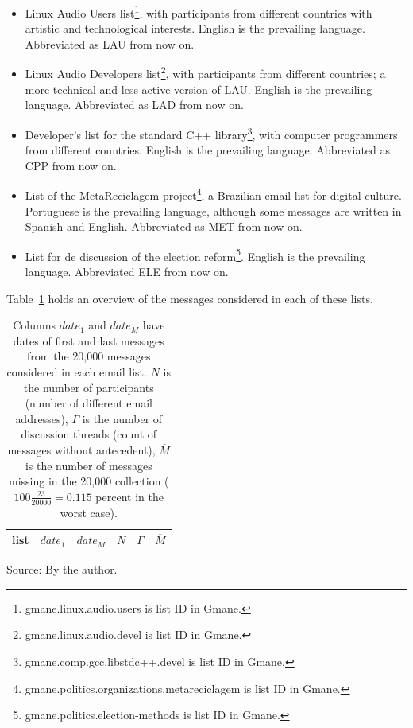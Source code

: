 \documentclass[review]{elsarticle}
\begin{document}
\begin{itemize}
\item Linux Audio Users list\footnote{gmane.linux.audio.users is list ID in Gmane.}, with participants from different countries with artistic and technological interests. English is the prevailing language. Abbreviated as LAU from now on.
\item Linux Audio Developers list\footnote{gmane.linux.audio.devel is list ID in Gmane.}, with participants from different countries; a more technical and less active version of LAU. English is the prevailing language. Abbreviated as LAD from now on.
\item Developer's list for the standard C++ library\footnote{gmane.comp.gcc.libstdc++.devel is list ID in Gmane.}, with computer programmers from different countries. English is the prevailing language. Abbreviated as CPP from now on.
\item List of the MetaReciclagem project\footnote{gmane.politics.organizations.metareciclagem is list ID in Gmane.}, a Brazilian email list for digital culture. Portuguese is the prevailing language, although some messages are written in Spanish and English. Abbreviated as MET from now on.
\item List for de discussion of the election reform\footnote{gmane.politics.election-methods is list ID in Gmane.}. English is the prevailing language. Abbreviated ELE from now on.
\end{itemize} 

Table~\ref{tab:genLists} holds an overview of the messages considered in each of these lists.

\begin{table}
\centering
\caption{Columns $date_1$ and $date_M$ have dates of first and last messages from the 20,000 messages considered in each email list.
$N$ is the number of participants (number of different email addresses),
$\Gamma$ is the number of discussion threads (count of messages without antecedent),
$\overline{M}$ is the number of messages missing in the 20,000 collection
($100\frac{23}{20000}=0.115$ percent in the worst case).
}
	\def\arraystretch{1.2}
\label{tab:genLists}
\begin{tabular}{l|c|c|c|c|c}\hline
list & $date_1$ & $date_{M}$ & $N$ & $\Gamma$ & $\overline{M}$ \\\hline

\end{tabular}
\begin{flushleft}\footnotesize
Source: By the author.\
\end{flushleft}
\end{table} 
\end{document}
